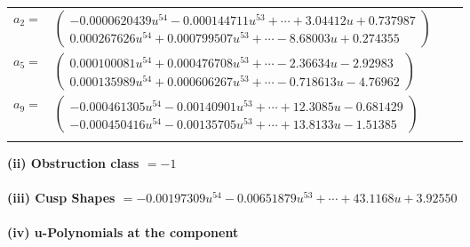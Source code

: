\documentclass[1p]{elsarticle_modified}
\theoremstyle{definition}
\begin{document}
\begin{tabular}{m{7pt} m{180pt} m{7pt} m{180pt} }
\flushright $a_{2}=$&$\begin{pmatrix}-0.0000620439 u^{54}-0.000144711 u^{53}+\cdots+3.04412 u+0.737987\\0.000267626 u^{54}+0.000799507 u^{53}+\cdots-8.68003 u+0.274355\end{pmatrix}$ \\
\flushright $a_{5}=$&$\begin{pmatrix}0.000100081 u^{54}+0.000476708 u^{53}+\cdots-2.36634 u-2.92983\\0.000135989 u^{54}+0.000606267 u^{53}+\cdots-0.718613 u-4.76962\end{pmatrix}$ \\
\flushright $a_{9}=$&$\begin{pmatrix}-0.000461305 u^{54}-0.00140901 u^{53}+\cdots+12.3085 u-0.681429\\-0.000450416 u^{54}-0.00135705 u^{53}+\cdots+13.8133 u-1.51385\end{pmatrix}$\\&\end{tabular}
\flushleft \textbf{(ii) Obstruction class $= -1$}\\~\\
\flushleft \textbf{(iii) Cusp Shapes $= -0.00197309 u^{54}-0.00651879 u^{53}+\cdots+43.1168 u+3.92550$}\\~\\
\newpage\renewcommand{\arraystretch}{1}
\flushleft \textbf{(iv) u-Polynomials at the component}\newline \\
\end{document}
